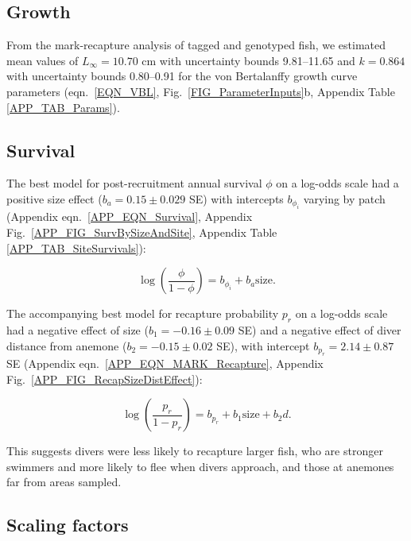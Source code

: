 \documentclass[12pt, oneside]{article}   	%
\begin{document}
\subsection{Growth} \label{APP_SEC_RESULTS_Growth}

From the mark-recapture analysis of tagged and genotyped fish, we estimated mean values of $L_\infty = 10.70$ cm with uncertainty bounds 9.81--11.65 and $k = 0.864$ with uncertainty bounds 0.80--0.91 for the von Bertalanffy growth curve parameters (eqn.\ \ref{EQN_VBL}, Fig.\ \ref{FIG_ParameterInputs}b, Appendix Table \ref{APP_TAB_Params}). 

\subsection{Survival} \label{APP_SEC_RESULTS_Survival}

The best model for post-recruitment annual survival $\phi$ on a log-odds scale had a positive size effect ($b_a = 0.15 \pm 0.029$ SE) with intercepts $b_{\phi_i}$ varying by patch (Appendix eqn.\ \ref{APP_EQN_Survival}, Appendix Fig.\ \ref{APP_FIG_SurvBySizeAndSite}, Appendix Table \ref{APP_TAB_SiteSurvivals}):

\begin{equation}
\log(\frac{\phi}{1-\phi}) = b_{\phi_i} + b_a\text{size}. \label{APP_EQN_Survival}
\end{equation}

The accompanying best model for recapture probability $p_r$ on a log-odds scale had a negative effect of size ($b_1 = -0.16 \pm 0.09$ SE) and a negative effect of diver distance from anemone ($b_2 = -0.15 \pm 0.02$ SE), with intercept $b_{p_r} = 2.14 \pm 0.87$ SE (Appendix eqn.\ \ref{APP_EQN_MARK_Recapture}, Appendix Fig.\ \ref{APP_FIG_RecapSizeDistEffect}):

\begin{equation}
\log(\frac{p_r}{1-p_r}) = b_{p_r} + b_1\text{size} + b_2d. \label{APP_EQN_MARK_Recapture}
\end{equation}

This suggests divers were less likely to recapture larger fish, who are stronger swimmers and more likely to flee when divers approach, and those at anemones far from areas sampled.

\subsection{Scaling factors} \label{APP_SEC_RESULTS_ScalingFactors}
\end{document}
